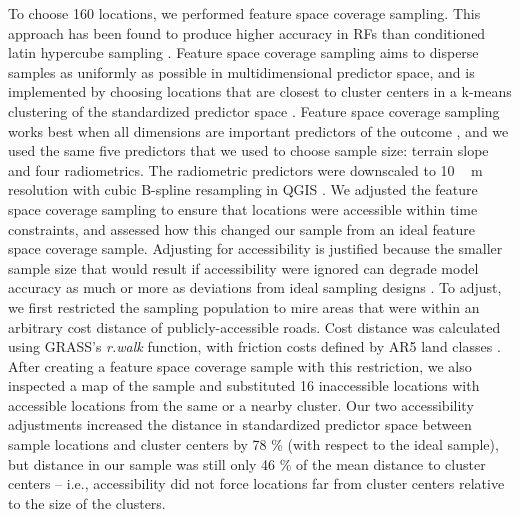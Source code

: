 \documentclass[soil, manuscript]{copernicus}
\begin{document}
To choose 160 locations, we performed feature space coverage sampling.
This approach has been found to produce higher accuracy in RFs than conditioned latin hypercube sampling \citep{wadouxSamplingDesignOptimization2019, maComparisonConditionedLatin2020}.
Feature space coverage sampling aims to disperse samples as uniformly as possible in multidimensional predictor space, and is implemented by choosing locations that are closest to cluster centers in a k-means clustering of the standardized predictor space \citep{brusSamplingDigitalSoil2019}.
Feature space coverage sampling works best when all dimensions are important predictors of the outcome \citep{wadouxSamplingDesignOptimization2019}, and we used the same five predictors that we used to choose sample size: terrain slope and four radiometrics.
The radiometric predictors were downscaled to \unit{10\,m} resolution with cubic B-spline resampling in QGIS \citep[v.3,][]{QGISsoftware}.
We adjusted the feature space coverage sampling to ensure that locations were accessible within time constraints, and assessed how this changed our sample from an ideal feature space coverage sample.
Adjusting for accessibility is justified because the smaller sample size that would result if accessibility were ignored can degrade model accuracy as much or more as deviations from ideal sampling designs \citep{wadouxSamplingDesignOptimization2019, maComparisonConditionedLatin2020}.
To adjust, we first restricted the sampling population to mire areas that were within an arbitrary cost distance of publicly-accessible roads.
Cost distance was calculated using GRASS's \emph{r.walk} function, with friction costs defined by AR5 land classes \citep{GRASSv8-2}.
After creating a feature space coverage sample with this restriction, we also inspected a map of the sample and substituted 16 inaccessible locations with accessible locations from the same or a nearby cluster.
Our two accessibility adjustments increased the distance in standardized predictor space between sample locations and cluster centers by 78 \% (with respect to the ideal sample), but distance in our sample was still only 46 \% of the mean distance to cluster centers -- i.e., accessibility did not force locations far from cluster centers relative to the size of the clusters.
\end{document}
